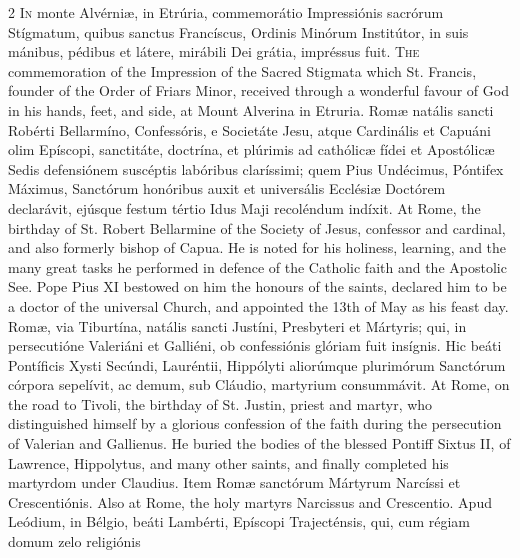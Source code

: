 \begin{paracol}{2}
\lettrine[lines=2]{I}{n} monte Alvérniæ, in 
 Etrúria, commemorátio Impressiónis sacrórum Stígmatum, quibus sanctus 
 Francíscus, Ordinis Minórum Institútor, in suis mánibus, pédibus et látere, 
 mirábili Dei grátia, impréssus fuit.
\switchcolumn
{}
\lettrine[lines=2]{T}{he} commemoration of the Impression 
 of the Sacred Stigmata which St. Francis, founder of the Order of Friars 
 Minor, received through a wonderful favour of God in his hands, feet, and 
 side, at Mount Alverina in Etruria.
\switchcolumn*
{}
Romæ natális sancti 
 Robérti Bellarmíno, Confessóris, e Societáte Jesu, atque Cardinális et 
 Capuáni olim Epíscopi, sanctitáte, doctrína, et plúrimis ad cathólicæ fídei 
 et Apostólicæ Sedis defensiónem suscéptis labóribus claríssimi; quem Pius 
 Undécimus, Póntifex Máximus, Sanctórum honóribus auxit et universális 
 Ecclésiæ Doctórem declarávit, ejúsque festum tértio Idus Maji recoléndum 
 indíxit.
\switchcolumn
{}
At Rome, the birthday of St. Robert 
 Bellarmine of the Society of Jesus, confessor and cardinal, and also 
 formerly bishop of Capua. He is noted for his holiness, learning, and 
 the many great tasks he performed in defence of the Catholic faith and the 
 Apostolic See. Pope Pius XI bestowed on him the honours of the saints, 
 declared him to be a doctor of the universal Church, and appointed the 13th 
 of May as his feast day.
\switchcolumn*
{}
Romæ, via Tiburtína, 
 natális sancti Justíni, Presbyteri et Mártyris; qui, in persecutióne 
 Valeriáni et Galliéni, ob confessiónis glóriam fuit insígnis. Hic 
 beáti Pontíficis Xysti Secúndi, Lauréntii, Hippólyti aliorúmque plurimórum 
 Sanctórum córpora sepelívit, ac demum, sub Cláudio, martyrium consummávit.
\switchcolumn
{}
At Rome, on the road to Tivoli, the 
 birthday of St. Justin, priest and martyr, who distinguished himself by a 
 glorious confession of the faith during the persecution of Valerian and 
 Gallienus. He buried the bodies of the blessed Pontiff Sixtus II, of 
 Lawrence, Hippolytus, and many other saints, and finally completed his 
 martyrdom under Claudius.
\switchcolumn*
{}
Item Romæ sanctórum 
 Mártyrum Narcíssi et Crescentiónis.
\switchcolumn
{}
Also at Rome, the holy martyrs 
 Narcissus and Crescentio.
\switchcolumn*
{}
Apud Leódium, in Bélgio, 
 beáti Lambérti, Epíscopi Trajecténsis, qui, cum régiam domum zelo religiónis 

\end{paracol}

